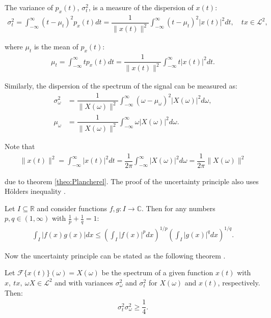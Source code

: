 The variance of $p_x(t)$, $\sigma_t^2$, is a measure of the dispersion of $x(t)$:
\begin{align*}
\sigma_t^2 = \int_{-\infty}^\infty (t - \mu_t)^2 p_x(t) dt = \dfrac{1}{\|x(t)\|^2} \int_{-\infty}^\infty (t - \mu_t)^2 |x(t)|^2 dt, \quad tx \in \mathcal{L}^2,
\end{align*}

where $\mu_t$ is the mean of $p_x(t)$:
\begin{align*}
\mu_t = \int_{-\infty}^\infty t p_x(t) dt = \dfrac{1}{\|x(t)\|^2} \int_{-\infty}^\infty t |x(t)|^2 dt.
\end{align*}

Similarly, the dispersion of the spectrum of the signal can be measured as:
\begin{align*}
\sigma_\omega^2 &= \dfrac{1}{\|X(\omega)\|^2} \int_{-\infty}^\infty (\omega - \mu_\omega)^2 |X(\omega)|^2 d\omega, \\
\mu_\omega &= \dfrac{1}{\|X(\omega)\|^2} \int_{-\infty}^\infty \omega |X(\omega)|^2 d\omega.
\end{align*}

Note that
\begin{align*}
\|x(t)\|^2 = \int_{-\infty}^\infty |x(t)|^2 dt = \dfrac{1}{2\pi} \int_{-\infty}^\infty |X(\omega)|^2 d\omega = \dfrac{1}{2\pi} \|X(\omega)\|^2
\end{align*}

due to theorem \ref{theo:Plancherel}. The proof of the uncertainty principle also uses Hölders inequality \cite{page 19, FSE2010}.
\begin{theorem} \label{theo:Hölder}
Let $I \subseteq \mathbb{R}$ and consider functions $f,g: I \to \mathbb{C}$. Then for any numbers $p,q \in (1,\infty)$ with $\frac{1}{p} + \frac{1}{q} = 1$:
\begin{align*}
\int_I |f(x) g(x)| dx \leq \left( \int_I |f(x)|^p dx \right)^{1/p} \left( \int_I |g(x)|^q dx \right)^{1/q}.
\end{align*}
\end{theorem}

Now the uncertainty principle can be stated as the following theorem \cite{pages 135-136, Wang}.

\begin{theorem} \label{theo:Heisenberg}
Let $\mathcal{F}\{x(t)\}(\omega) = X(\omega)$ be the spectrum of a given function $x(t)$ with $x, \ tx, \ \omega X \in \mathcal{L}^2$ and with variances $\sigma_\omega^2$ and $\sigma_t^2$ for $X(\omega)$ and $x(t)$, respectively. Then:
\begin{align*}
\sigma_t^2 \sigma_\omega^2 \geq \dfrac{1}{4}.
\end{align*}
\end{theorem}

